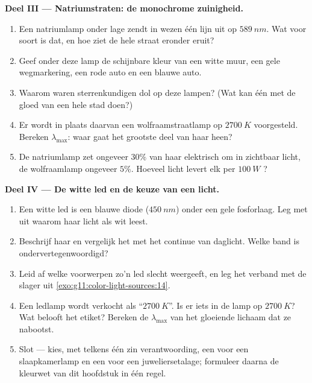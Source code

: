 \begin{problem}
\medskip
\noindent\textbf{Deel III --- Natriumstraten: de monochrome zuinigheid.}
\begin{enumerate}[resume]
  \item Een natriumlamp onder lage  zendt in wezen één lijn uit op
        $\qty{589}{nm}$. Wat voor soort  is dat, en hoe ziet de
        hele straat eronder eruit?
  \item Geef onder deze lamp de schijnbare kleur van een witte muur, een
        gele wegmarkering, een rode auto en een blauwe auto.
  \item Waarom waren sterrenkundigen dol op deze lampen? (Wat kan één
         met de gloed van een hele stad doen?)
  \item Er wordt in plaats daarvan een wolfraamstraatlamp op
        $\qty{2700}{K}$ voorgesteld. Bereken $\lambda_{\max}$: waar gaat
        het grootste deel van haar  heen?
  \item De natriumlamp zet ongeveer $30\%$ van haar elektrisch 
        om in zichtbaar licht, de wolfraamlamp ongeveer $5\%$. Hoeveel
         licht levert elk per $\qty{100}{W}$ ?
\end{enumerate}

\medskip
\noindent\textbf{Deel IV --- De witte led en de keuze van een licht.}
\begin{enumerate}[resume]
  \item Een witte led is een blauwe diode ($\qty{450}{nm}$) onder een
        gele fosforlaag. Leg met  uit waarom haar
        licht als wit leest.
  \item Beschrijf haar  en vergelijk het met het continue
         van daglicht. Welke band is ondervertegenwoordigd?
  \item Leid af welke voorwerpen zo'n led slecht weergeeft, en leg het
        verband met de slager uit
        \cref{exo:g11:color-light-sources:14}.
  \item Een ledlamp wordt verkocht als ``$\qty{2700}{K}$''. Is er iets
        in de lamp op $\qty{2700}{K}$? Wat belooft het etiket? Bereken de
        $\lambda_{\max}$ van het gloeiende lichaam dat ze nabootst.
  \item Slot --- kies, met telkens één zin verantwoording, een
         voor een slaapkamerlamp en een voor een
        juweliersetalage; formuleer daarna de kleurwet van dit hoofdstuk
        in één regel.
\end{enumerate}
\end{problem}
